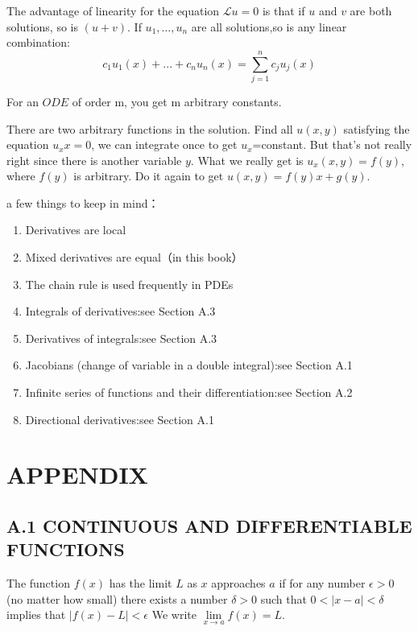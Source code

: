 \documentclass[hazy,blue,11pt]{elegantnote}
\begin{document}
\begin{theorem}
    The advantage of linearity for the equation $\mathscr{L}u=0$ is that if $u$ and $v$ are both solutions, so is $(u+v)$. If $u_1,..., u_n$ are all solutions,so is any linear combination:
\begin{equation}
    c_1 u_1(x)+...+c_n u_n(x)=\sum_{j=1}^n c_j u_j(x)
\end{equation}
\end{theorem}
\begin{theorem}
    For an $ODE$ of order m, you get m arbitrary constants.
\end{theorem}

\begin{note}
    There are two arbitrary functions in the solution. Find all $u(x,y)$ satisfying the equation $u_xx=0$, we can integrate once to get $u_x$=constant. But that’s not really right since there is another variable $y$. What we really get is $u_x(x,y)=f(y)$, where $f(y)$ is arbitrary. Do it again to get $u(x,y)=f(y)x+g(y)$.
\end{note}

a few things to keep in mind：
\begin{enumerate}
  \item Derivatives are local
  \item Mixed derivatives are equal（in this book）
  \item The chain rule is used frequently in PDEs
  \item Integrals of derivatives:see Section A.3
  \item Derivatives of integrals:see Section A.3
  \item Jacobians (change of variable in a double integral):see Section A.1
  \item Infinite series of functions and their differentiation:see Section A.2
  \item Directional derivatives:see Section A.1
\end{enumerate}

\section{APPENDIX}%
\subsection{A.1 CONTINUOUS AND DIFFERENTIABLE FUNCTIONS}
\begin{definition}[limit]
    The function $f(x)$ has the limit $L$ as $x$ approaches $a$ if for any number $\epsilon>0$ (no matter how small) there exists a number $\delta>0$ such that $0<|x-a|<\delta$ implies that $|f(x)-L|<\epsilon$ We write $\lim\limits_{x \to a} f(x) =L$.
\end{definition}
\end{document}

